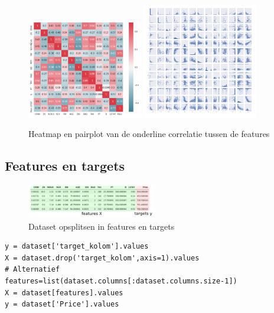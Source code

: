 \documentclass{article}
\begin{document}
\begin{figure}[H]
    \centering
    \includegraphics[width=0.45\textwidth]{multiple-regression-heatmap.png}
    \includegraphics[width=0.45\textwidth]{multiple-regression-pairplot.png}
    \caption{Heatmap en pairplot van de onderline correlatie tussen de features}
\end{figure}

\subsection{Features en targets}

\begin{figure}[H]
    \centering
    \includegraphics[width=0.5\textwidth]{multiple-regression-features-targets.png}
    \caption{Dataset opsplitsen in features en targets}
\end{figure}

\begin{verbatim}
y = dataset['target_kolom'].values
X = dataset.drop('target_kolom',axis=1).values
# Alternatief
features=list(dataset.columns[:dataset.columns.size-1])
X = dataset[features].values
y = dataset['Price'].values
\end{verbatim}
\end{document}
